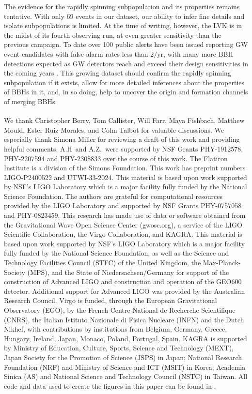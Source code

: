 \documentclass[twocolumn,usenames,dvipsnames,linenumbers]{aastex631}
\begin{document}
The evidence for the rapidly spinning subpopulation and its properties remains tentative.
With only 69 events in our dataset, our ability to infer fine details and isolate subpopulations is limited.
At the time of writing, however, the \ac{LVK} is in the midst of its fourth observing run, at even greater sensitivity 
than the previous campaign.
To date over 100 public alerts have been issued reporting \ac{GW} event candidates with false alarm rates less than $2/\mathrm{yr}$, with many 
more \ac{BBH} detections expected as \ac{GW} detectors reach and exceed their design sensitivities in the coming years \citep{KAGRA:2013rdx}.
This growing dataset should confirm the rapidly spinning subpopulation if it exists, allow for more detailed inferences
about the properties of \acp{BBH} in it, and, in so doing, help to uncover the origin and formation channels of merging \acp{BBH}.\\
\\
\noindent We thank Christopher Berry, Tom Callister, Will Farr, Maya Fishbach, Matthew Mould, Ester Ruiz-Morales, and Colm Talbot for valuable discussions.
We especially thank Simona Miller for reviewing a draft of this work and providing helpful comments.
A.H~and A.Z.~were supported by NSF Grants PHY-1912578, PHY-2207594 and PHY-2308833 over the course of this work.
The Flatiron Institute is a division of the Simons Foundation.
This work has preprint numbers LIGO-P2400522 and UTWI-33-2024.
This material is based upon work supported by NSF's LIGO Laboratory which is a major facility fully funded by the National Science Foundation.
The authors are grateful for computational resources provided by the LIGO Laboratory and supported by NSF Grants PHY-0757058 and PHY-0823459.
This research has made use of data or software obtained from the Gravitational Wave Open Science Center (gwosc.org), a service of the LIGO Scientific Collaboration, the Virgo Collaboration, and KAGRA. 
This material is based upon work supported by NSF's LIGO Laboratory which is a major facility fully funded by the National Science Foundation, as well as the Science and Technology Facilities Council (STFC) of the United Kingdom, the Max-Planck-Society (MPS), and the State of Niedersachsen/Germany for support of the construction of Advanced LIGO and construction and operation of the GEO600 detector. 
Additional support for Advanced LIGO was provided by the Australian Research Council. 
Virgo is funded, through the European Gravitational Observatory (EGO), by the French Centre National de Recherche Scientifique (CNRS), the Italian Istituto Nazionale di Fisica Nucleare (INFN) and the Dutch Nikhef, with contributions by institutions from Belgium, Germany, Greece, Hungary, Ireland, Japan, Monaco, Poland, Portugal, Spain. 
KAGRA is supported by Ministry of Education, Culture, Sports, Science and Technology (MEXT), Japan Society for the Promotion of Science (JSPS) in Japan; National Research Foundation (NRF) and Ministry of Science and ICT (MSIT) in Korea; Academia Sinica (AS) and National Science and Technology Council (NSTC) in Taiwan.
All code and data used to create the figures in this paper can be found in \cite{Hussain2024SpinMagnitude}.
\end{document}
